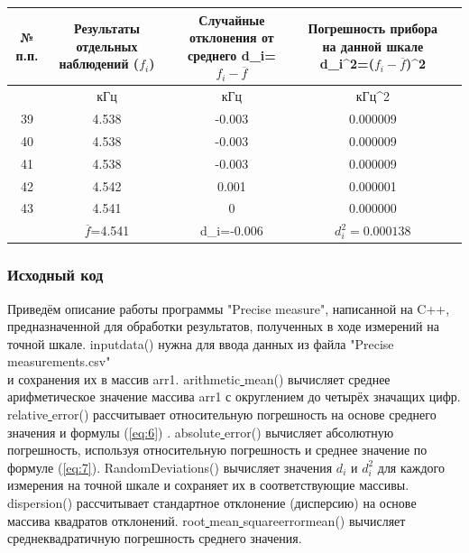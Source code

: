 \begin{center}
\begin{table}[H]
\centering

\label{tabl:11}
\begin{tabular}{|c|c|c|c|c|}
\hline
\begin{minipage}{7mm}
    № п.п. 
\end{minipage}&
\begin{minipage}{5cm}
    Результаты отдельных наблюдений ($f_i$)
\end{minipage} &
\begin{minipage}{5cm}
    Случайные отклонения от среднего d_i=$f_i-\overline{f}$
\end{minipage} &
\begin{minipage}{5cm}
    Погрешность прибора на данной шкале d_i^2=($f_i-$$\overline{f}$)^2
\end{minipage}\\
\hline
{}&кГц&кГц&кГц^2\\
\hline
39 &  4.538  &  -0.003 & 0.000009 \\
40 &  4.538  &  -0.003 & 0.000009 \\
41 &  4.538  &  -0.003 & 0.000009 \\
42 &  4.542  &  0.001 & 0.000001 \\
43 &  4.541  &  0 & 0.000000 \\
\hline
   &  $\overline{f}$=4.541 & d_i=-0.006 & $d_i^2=0.000138$\\
\hline
\end{tabular}
\end{table}
\end{center}
\subsubsection{Исходный код}
Приведём описание работы программы "Precise measure", написанной на C++, предназначенной для обработки результатов, полученных в ходе измерений на точной шкале. 
 inputdata() нужна для ввода данных из файла "Precise measurements.csv" \\и сохранения их в массив arr1.
 arithmetic\underline{ }mean() вычисляет среднее арифметическое значение массива arr1 с округлением до четырёх значащих цифр.
 relative\underline{ }error() рассчитывает относительную погрешность на основе среднего значения и формулы (\ref{eq:6}) .
 absolute\underline{ }error() вычисляет абсолютную погрешность, используя относительную погрешность и среднее значение по формуле (\ref{eq:7}).
 RandomDeviations() вычисляет значения $d_i$ и $d_i^2$ для каждого измерения на точной шкале и сохраняет их в соответствующие массивы.
 dispersion() рассчитывает стандартное отклонение (дисперсию) на основе массива квадратов отклонений.
 root\underline{ }mean\underline{ }square\underline{}error\underline{}mean() вычисляет среднеквадратичную погрешность среднего значения.

